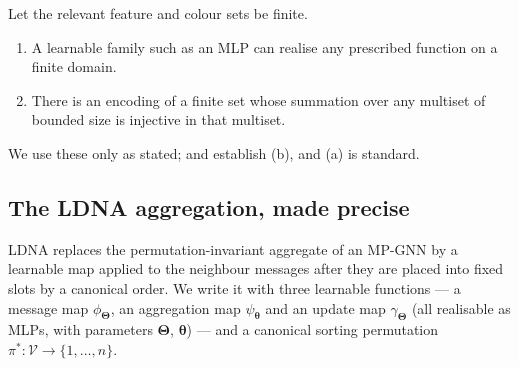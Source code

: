 \begin{fact}
\label{fact:expr-finite}
Let the relevant feature and colour sets be finite.
\begin{enumerate}
  \item[(a)] A learnable family such as an MLP can realise any prescribed
        function on a finite domain.
  \item[(b)] There is an encoding of a finite set whose summation over any
        multiset of bounded size is injective in that multiset.
\end{enumerate}
We use these only as stated; \citet[Lemma~5]{Xu2019GIN} and
\citet{Zaheer2017DeepSets} establish (b), and (a) is standard.
\end{fact}

\subsection{The LDNA aggregation, made precise}
\label{sec:expr-ldna}

LDNA replaces the permutation-invariant aggregate of an MP-GNN by a learnable
map applied to the neighbour messages after they are placed into fixed slots by a
canonical order. We write it with three learnable functions --- a message map
$\phi_{\bm{\Theta}}$, an aggregation map $\psi_{\bm{\theta}}$ and an update map
$\gamma_{\bm{\Theta}}$ (all realisable as MLPs, with parameters $\bm{\Theta}$,
$\bm{\theta}$) --- and a canonical sorting permutation
$\pi^*:\mathcal{V}\to\{1,\dots,n\}$.

